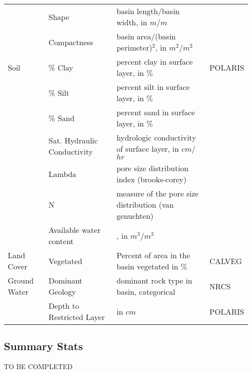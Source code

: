 \begin{longtable}[h]{p{2cm}p{2.55cm}p{8.04cm}p{2.24cm}}
	& Shape & basin length/basin width, in $m/m$ &  \\
	 & Compactness & basin area/(basin perimeter)$^2$, in $m^2/m^2$ &  \\
	\midrule
	Soil & \% Clay & percent clay in surface layer, in $\%$ & POLARIS \cite{chaney2016polaris} \\
	 & \% Silt & percent silt in surface layer, in $\%$ &  \\
	 & \% Sand & percent sand in surface layer, in $\%$ &  \\
	 & Sat. Hydraulic Conductivity & hydrologic conductivity of surface layer, in $cm$/$hr$ &  \\
	 & Lambda & pore size distribution index (brooks-corey) & \\
	 & N & measure of the pore size distribution (van genuchten) & \\
	 & Available water content &, in $m^3/m^3$ & \\ 
	\midrule
	Land Cover & Vegetated & Percent of area in the basin vegetated in $\%$ & CALVEG \cite{calveg2004vegetation} \\
	\midrule
	Ground Water & Dominant Geology & dominant rock type in basin, categorical & NRCS \cite{nrcs2006land} \\
	& Depth to Restricted Layer & in $cm$ & POLARIS \cite{chaney2016polaris}\\
	\bottomrule
	\end{longtable}
	\label{table:bcmvariables}
\endgroup

\subsection*{Summary Stats}
TO BE COMPLETED